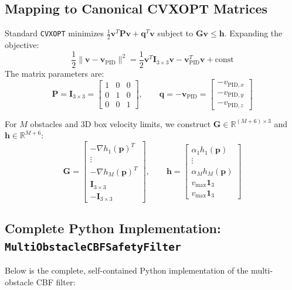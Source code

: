 \documentclass[11pt,a4paper]{article}
\begin{document}
\subsection{Mapping to Canonical CVXOPT Matrices}
Standard \texttt{CVXOPT} minimizes $\frac{1}{2} \mathbf{v}^T \mathbf{P} \mathbf{v} + \mathbf{q}^T \mathbf{v}$ subject to $\mathbf{G}\mathbf{v} \le \mathbf{h}$. Expanding the objective:
\begin{equation}
\frac{1}{2} \|\mathbf{v} - \mathbf{v}_{\mathrm{PID}}\|^2 = \frac{1}{2} \mathbf{v}^T \mathbf{I}_{3 \times 3} \mathbf{v} - \mathbf{v}_{\mathrm{PID}}^T \mathbf{v} + \text{const}
\end{equation}
The matrix parameters are:
\begin{equation}
\mathbf{P} = \mathbf{I}_{3 \times 3} = \begin{bmatrix} 1 & 0 & 0 \\ 0 & 1 & 0 \\ 0 & 0 & 1 \end{bmatrix}, \qquad
\mathbf{q} = -\mathbf{v}_{\mathrm{PID}} = \begin{bmatrix} -v_{\mathrm{PID}, x} \\ -v_{\mathrm{PID}, y} \\ -v_{\mathrm{PID}, z} \end{bmatrix}
\end{equation}

For $M$ obstacles and 3D box velocity limits, we construct $\mathbf{G} \in \mathbb{R}^{(M+6) \times 3}$ and $\mathbf{h} \in \mathbb{R}^{M+6}$:
\begin{equation}
\mathbf{G} = \begin{bmatrix}
-\nabla h_1(\mathbf{p})^T \\
\vdots \\
-\nabla h_M(\mathbf{p})^T \\
\mathbf{I}_{3 \times 3} \\
-\mathbf{I}_{3 \times 3}
\end{bmatrix}, \qquad
\mathbf{h} = \begin{bmatrix}
\alpha_1 h_1(\mathbf{p}) \\
\vdots \\
\alpha_M h_M(\mathbf{p}) \\
v_{\max} \mathbf{1}_3 \\
v_{\max} \mathbf{1}_3
\end{bmatrix}
\label{eq:cvxopt_cbf_mapping}
\end{equation}

\subsection{Complete Python Implementation: \texttt{MultiObstacleCBFSafetyFilter}}
Below is the complete, self-contained Python implementation of the multi-obstacle CBF filter:
\end{document}
